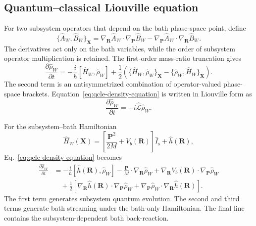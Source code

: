 \documentclass[
  11pt,
  letterpaper,
  onehalfspacing,
  normalmargins,
  equalmargins,
  oneside
]{ut-thesis}
\begin{document}
\subsection{Quantum--classical Liouville equation}
\label{subsec:qcle-equation}

For two subsystem operators that depend on the bath phase-space point, define
\begin{equation}
\{\hat A_W,\hat B_W\}_{\mathbf X}
=
\nabla_{\mathbf R}\hat A_W\cdot
\nabla_{\mathbf P}\hat B_W
-
\nabla_{\mathbf P}\hat A_W\cdot
\nabla_{\mathbf R}\hat B_W.
\label{eq:bath-poisson-bracket}
\end{equation}
The derivatives act only on the bath variables, while the order of subsystem
operator multiplication is retained. The first-order mass-ratio truncation
gives
\begin{equation}
\frac{\partial\hat\rho_W}{\partial t}
=
-
\frac{i}{\hbar}
[\hat H_W,\hat\rho_W]
+
\frac{1}{2}
\left(
\{\hat H_W,\hat\rho_W\}_{\mathbf X}
-
\{\hat\rho_W,\hat H_W\}_{\mathbf X}
\right).
\label{eq:qcle-density-equation}
\end{equation}
The second term is an antisymmetrized combination of operator-valued
phase-space brackets. Equation~\eqref{eq:qcle-density-equation} is written in
Liouville form as
\begin{equation}
\frac{\partial\hat\rho_W}{\partial t}
=
-i\hat{\mathcal L}\hat\rho_W.
\label{eq:qcle-liouville-operator-form}
\end{equation}

For the subsystem--bath Hamiltonian
\begin{equation}
\hat H_W(\mathbf X)
=
\left[
\frac{\mathbf P^2}{2M}
+
V_b(\mathbf R)
\right]
\hat I_{\mathrm s}
+
\hat h(\mathbf R),
\label{eq:qcle-subsystem-bath-hamiltonian}
\end{equation}
Eq.~\eqref{eq:qcle-density-equation} becomes
\begin{align}
\frac{\partial\hat\rho_W}{\partial t}
&=
-
\frac{i}{\hbar}
[\hat h(\mathbf R),\hat\rho_W]
-
\frac{\mathbf P}{M}\cdot
\nabla_{\mathbf R}\hat\rho_W
+
\nabla_{\mathbf R}V_b(\mathbf R)\cdot
\nabla_{\mathbf P}\hat\rho_W
\nonumber\\
&\quad
+
\frac{1}{2}
\left[
\nabla_{\mathbf R}\hat h(\mathbf R)\cdot
\nabla_{\mathbf P}\hat\rho_W
+
\nabla_{\mathbf P}\hat\rho_W\cdot
\nabla_{\mathbf R}\hat h(\mathbf R)
\right].
\label{eq:qcle-density-expanded}
\end{align}
The first term generates subsystem quantum evolution. The second and third
terms generate bath streaming under the bath-only Hamiltonian. The final line
contains the subsystem-dependent bath back-reaction.
\end{document}

